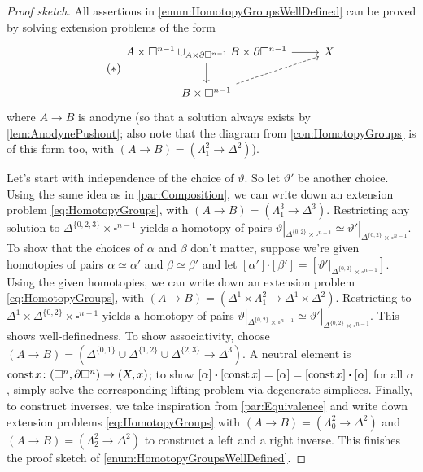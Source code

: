 \begin{proof}[Proof sketch]
	All assertions in \cref{enum:HomotopyGroupsWellDefined} can be proved by solving extension problems of the form
	\begin{equation}\label{eq:HomotopyGroups}\tag{$*$}
		\begin{tikzcd}
			A\times\square^{n-1}\cup_{A\times\partial\square^{n-1}}B\times\partial\square^{n-1}\dar\rar & X\\
			B\times\square^{n-1}\urar[dashed,end anchor=202]
		\end{tikzcd}
	\end{equation}
	where $A\rightarrow B$ is anodyne (so that a solution always exists by \cref{lem:AnodynePushout}; also note that the diagram from \cref{con:HomotopyGroups} is of this form too, with $(A\rightarrow B)=(\Lambda_1^2\rightarrow\Delta^2)$).
	
	Let's start with independence of the choice of $\vartheta$. So let $\vartheta'$ be another choice. Using the same idea as in \cref{par:Composition}, we can write down an extension problem \cref{eq:HomotopyGroups}, with $(A\rightarrow B)=(\Lambda_1^3\rightarrow \Delta^3)$. Restricting any solution to $\Delta^{\{0,2,3\}}\times \square^{n-1}$ yields a homotopy of pairs $\vartheta|_{\Delta^{\{0,2\}}\times\square^{n-1}}\simeq\vartheta'|_{\Delta^{\{0,2\}}\times\square^{n-1}}$. To show that the choices of $\alpha$ and $\beta$ don't matter, suppose we're given homotopies of pairs $\alpha\simeq\alpha'$ and $\beta\simeq\beta'$ and let $[\alpha']\boldsymbol{\cdot}[\beta']=[\vartheta'|_{\Delta^{\{0,2\}}\times\square^{n-1}}]$. Using the given homotopies, we can write down an extension problem \cref{eq:HomotopyGroups}, with $(A\rightarrow B)=(\Delta^1\times\Lambda_1^2\rightarrow \Delta^1\times\Delta^2)$. Restricting to $\Delta^1\times\Delta^{\{0,2\}}\times\square^{n-1}$ yields a homotopy  of pairs $\vartheta|_{\Delta^{\{0,2\}}\times\square^{n-1}}\simeq\vartheta'|_{\Delta^{\{0,2\}}\times\square^{n-1}}$. This shows well-definedness. To show associativity, choose $(A\rightarrow B)=(\Delta^{\{0,1\}}\cup\Delta^{\{1,2\}}\cup\Delta^{\{2,3\}}\rightarrow\Delta^3)$. A neutral element is $\operatorname{const} x\colon (\square^n,\partial\square^n)\rightarrow (X,x)$; to show $[\alpha]\boldsymbol{\cdot}[\operatorname{const} x]=[\alpha]=[\operatorname{const} x]\boldsymbol{\cdot}[\alpha]$ for all $\alpha$, simply solve the corresponding lifting problem via degenerate simplices. Finally, to construct inverses, we take inspiration from \cref{par:Equivalence} and write down extension problems \cref{eq:HomotopyGroups} with $(A\rightarrow B)=(\Lambda_0^2\rightarrow\Delta^2)$ and $(A\rightarrow B)=(\Lambda_2^2\rightarrow\Delta^2)$ to construct a left and a right inverse. This finishes the proof sketch of \cref{enum:HomotopyGroupsWellDefined}.
	

\end{proof}
